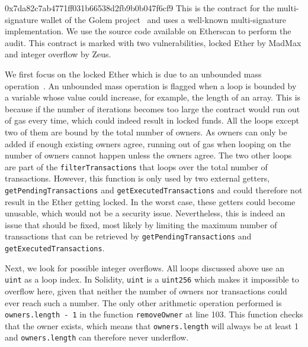 \begin{investigation}{0x7da82c7ab4771ff031b66538d2fb9b0b047f6cf9}
	This is the contract for the multi-signature wallet of the Golem project~\cite{golem-project} and uses a well-known multi-signature implementation. We use the source code available on Etherscan to perform the audit.
	This contract is marked with two vulnerabilities, locked Ether by MadMax and integer overflow by Zeus.

	We first focus on the locked Ether which is due to an unbounded mass operation~\cite{Grech2018}.
	An unbounded mass operation is flagged when a loop is bounded by a variable whose value could increase, for example, the length of an array.
	This is because if the number of iterations becomes too large the contract would run out of gas every time, which could indeed result in locked funds.
	All the loops except two of them are bound by the total number of owners. As owners can only be added if enough existing owners agree, running out of gas when looping on the number of owners cannot happen unless the owners agree.
	The two other loops are part of the \lstinline{filterTransactions} that loops over the total number of transactions.
	However, this function is only used by two external getters, \lstinline{getPendingTransactions} and \lstinline{getExecutedTransactions} and could therefore not result in the Ether getting locked.
	In the worst case, these getters could become unusable, which would not be a security issue.
	Nevertheless, this is indeed an issue that should be fixed, most likely by limiting the maximum number of transactions that can be retrieved by \lstinline{getPendingTransactions} and \lstinline{getExecutedTransactions}.

	Next, we look for possible integer overflows. All loops discussed above use an \lstinline{uint} as a loop index. In Solidity, \lstinline{uint} is a \lstinline{uint256} which makes it impossible to overflow here, given that neither the number of owners nor transactions could ever reach such a number. The only other arithmetic operation performed is \lstinline{owners.length - 1} in the function \lstinline{removeOwner} at line 103. This function checks that the owner exists, which means that \lstinline{owners.length} will always be at least 1 and \lstinline{owners.length} can therefore never underflow.
\end{investigation}

